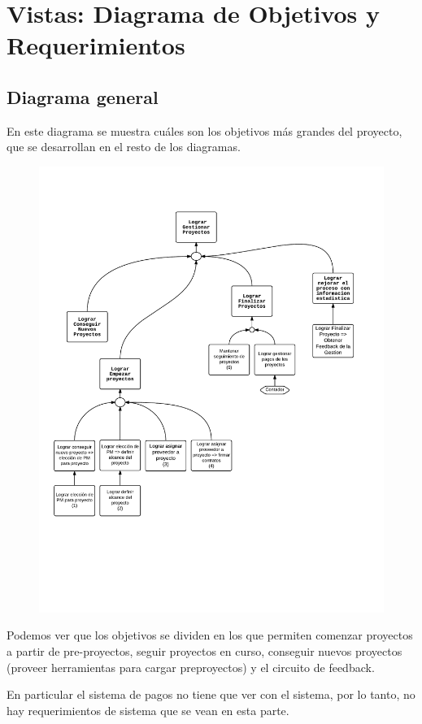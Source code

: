 \section{Vistas: Diagrama de Objetivos y Requerimientos}
\subsection{Diagrama general}
En este diagrama se muestra cuáles son los objetivos más grandes del proyecto, que se desarrollan en el resto de los diagramas.
\begin{figure}[H]
\includegraphics[width=\textwidth, clip=true, trim=15pt 170pt 15pt 80pt]{imagenes/objetivos/objetivos10.pdf}
\end{figure}
Podemos ver que los objetivos se dividen en los que permiten comenzar proyectos a partir de pre-proyectos, seguir proyectos en curso, conseguir nuevos proyectos (proveer herramientas para cargar preproyectos) y el circuito de feedback.

En particular el sistema de pagos no tiene que ver con el sistema, por lo tanto, no hay requerimientos de sistema que se vean en esta parte.

